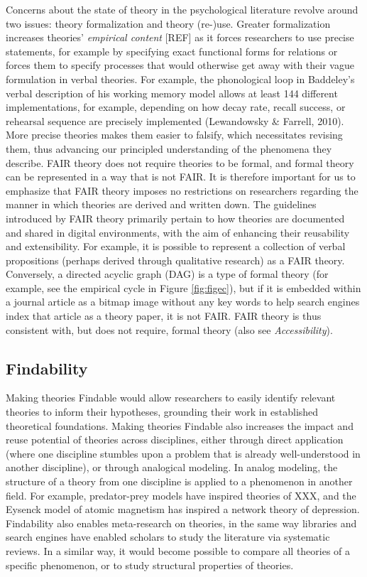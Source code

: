 \documentclass[
  man,floatsintext]{apa6}
\begin{document}
Concerns about the state of theory in the psychological literature revolve around two issues: theory formalization and theory (re-)use.
Greater formalization increases theories' \emph{empirical content} {[}REF{]} as it forces researchers to use precise statements, for example by specifying exact functional forms for relations or forces them to specify processes that would otherwise get away with their vague formulation in verbal theories.
For example, the phonological loop in Baddeley's verbal description of his working memory model allows at least 144 different implementations, for example, depending on how decay rate, recall success, or rehearsal sequence are precisely implemented (Lewandowsky \& Farrell, 2010).
More precise theories makes them easier to falsify,
which necessitates revising them,
thus advancing our principled understanding of the phenomena they describe.
FAIR theory does not require theories to be formal,
and formal theory can be represented in a way that is not FAIR.
It is therefore important for us to emphasize that FAIR theory imposes no restrictions on researchers regarding the manner in which theories are derived and written down.
The guidelines introduced by FAIR theory primarily pertain to how theories are documented and shared in digital environments, with the aim of enhancing their reusability and extensibility.
For example, it is possible to represent a collection of verbal propositions (perhaps derived through qualitative research) as a FAIR theory.
Conversely, a directed acyclic graph (DAG) is a type of formal theory (for example, see the empirical cycle in Figure \ref{fig:figec}),
but if it is embedded within a journal article as a bitmap image without any key words to help search engines index that article as a theory paper,
it is not FAIR.
FAIR theory is thus consistent with, but does not require, formal theory (also see \emph{Accessibility}).

\subsection{Findability}\label{findability}

Making theories Findable would allow researchers to easily identify relevant theories to inform their hypotheses,
grounding their work in established theoretical foundations.
Making theories Findable also increases the impact and reuse potential of theories across disciplines,
either through direct application (where one discipline stumbles upon a problem that is already well-understood in another discipline),
or through analogical modeling.
In analog modeling, the structure of a theory from one discipline is applied to a phenomenon in another field.
For example, predator-prey models have inspired theories of XXX, and the Eysenck model of atomic magnetism has inspired a network theory of depression.
Findability also enables meta-research on theories,
in the same way libraries and search engines have enabled scholars to study the literature via systematic reviews.
In a similar way, it would become possible to compare all theories of a specific phenomenon,
or to study structural properties of theories.
\end{document}
